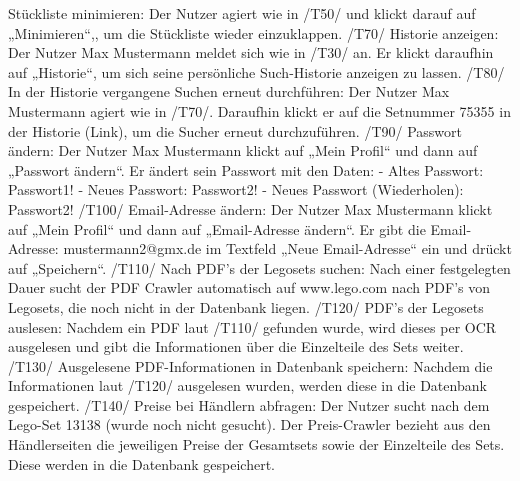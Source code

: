 Stückliste minimieren: Der Nutzer agiert wie in /T50/ und klickt darauf auf „Minimieren“,, um die Stückliste wieder einzuklappen. \newline 
\newline 
/T70/ \newline 
Historie anzeigen: Der Nutzer Max Mustermann meldet sich wie in /T30/ an. Er klickt daraufhin auf „Historie“, um sich seine persönliche Such-Historie anzeigen zu lassen. \newline 
\newline 
/T80/ \newline 
In der Historie vergangene Suchen erneut durchführen: Der Nutzer Max Mustermann agiert wie in /T70/. Daraufhin klickt er auf die Setnummer 75355 in der Historie (Link), um die Sucher erneut durchzuführen. \newline 
\newline 
/T90/ \newline Passwort ändern: Der Nutzer Max Mustermann klickt auf „Mein Profil“ und dann auf „Passwort ändern“. Er ändert sein Passwort mit den Daten: \newline 
- Altes Passwort: Passwort1! \newline 
- Neues Passwort: Passwort2! \newline 
- Neues Passwort (Wiederholen): Passwort2! \newline 
\newline 
/T100/ \newline 
Email-Adresse ändern: Der Nutzer Max Mustermann klickt auf „Mein Profil“ und dann auf „Email-Adresse ändern“. Er gibt die Email-Adresse: mustermann2@gmx.de im Textfeld „Neue Email-Adresse“ ein und drückt auf „Speichern“. \newline 
\newline 
/T110/ \newline 
Nach PDF’s der Legosets suchen: Nach einer festgelegten Dauer sucht der PDF Crawler automatisch auf www.lego.com nach PDF’s von Legosets, die noch nicht in der Datenbank liegen. \newline \newline
\newline
/T120/ \newline 
PDF’s der Legosets auslesen: Nachdem ein PDF laut /T110/ gefunden wurde, wird dieses per OCR ausgelesen und gibt die Informationen über die Einzelteile des Sets weiter. \newline 
\newline 
/T130/ \newline 
Ausgelesene PDF-Informationen in Datenbank speichern: Nachdem die Informationen laut /T120/ ausgelesen wurden, werden diese in die Datenbank gespeichert. \newline 
\newline 
/T140/ \newline 
Preise bei Händlern abfragen: Der Nutzer sucht nach dem Lego-Set 13138 (wurde noch nicht gesucht). Der Preis-Crawler bezieht aus den Händlerseiten die jeweiligen Preise der Gesamtsets sowie der Einzelteile des Sets. Diese werden in die Datenbank gespeichert. \newline 
